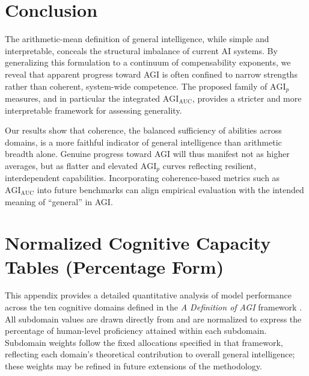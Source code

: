 \documentclass{article}
\newcommand{\score}[1]{%
  \begingroup
  \edef\val{#1}%
  \ifdim \val pt > 50pt
    \textcolor{green!40!black}{#1}%
  \else
    \textcolor{red!40!black}{#1}%
  \fi
  \endgroup
}
\begin{document}
\section{Conclusion}

The arithmetic-mean definition of general intelligence, while simple and interpretable, conceals the structural imbalance of current AI systems. By generalizing this formulation to a continuum of compensability exponents, we reveal that apparent progress toward AGI is often confined to narrow strengths rather than coherent, system-wide competence. The proposed family of $\mathrm{AGI}_p$ measures, and in particular the integrated $\mathrm{AGI}_{\text{AUC}}$, provides a stricter and more interpretable framework for assessing generality. 

Our results show that coherence, the balanced sufficiency of abilities across domains, is a more faithful indicator of general intelligence than arithmetic breadth alone. Genuine progress toward AGI will thus manifest not as higher averages, but as flatter and elevated $\mathrm{AGI}_p$ curves reflecting resilient, interdependent capabilities. Incorporating coherence-based metrics such as $\mathrm{AGI}_{\text{AUC}}$ into future benchmarks can align empirical evaluation with the intended meaning of ``general'' in AGI.


\newpage







\newpage
\appendix

\providecommand{\score}[1]{#1}

\section{Normalized Cognitive Capacity Tables (Percentage Form)}
\label{appendix:norm}



This appendix provides a detailed quantitative analysis of model performance across the ten cognitive domains defined in the \textit{A Definition of AGI} framework \citep{hendrycks2025agidefinition}.
All subdomain values are drawn directly from \citet{hendrycks2025agidefinition} and are normalized to express the percentage of human-level proficiency attained within each subdomain.
Subdomain weights follow the fixed allocations specified in that framework, reflecting each domain’s theoretical contribution to overall general intelligence; these weights may be refined in future extensions of the methodology.
\end{document}
